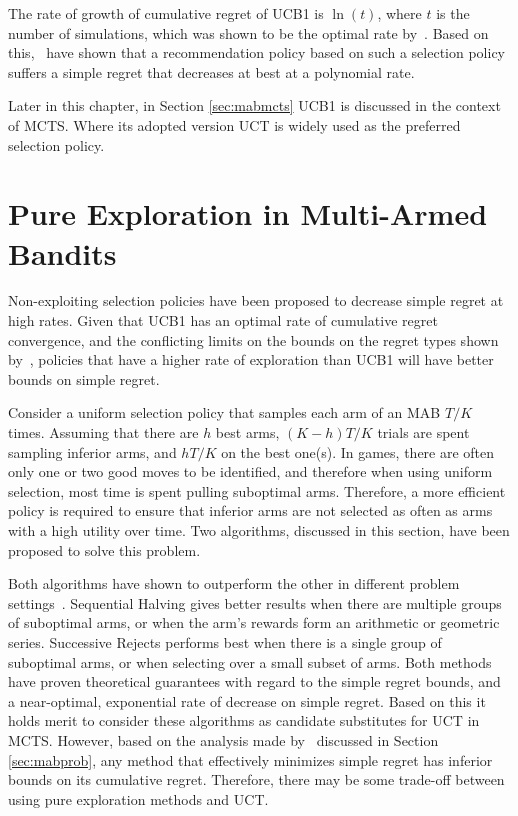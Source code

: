 \documentclass{kecsmstr}
\begin{document}
The rate of growth of cumulative regret of UCB1 is $\ln(t)$, where $t$ is the number of simulations, which was shown to be the optimal rate by~. Based on this,~ have shown that a recommendation policy based on such a selection policy suffers a simple regret that decreases at best at a polynomial rate. 

Later in this chapter, in Section \ref{sec:mabmcts} UCB1 is discussed in the context of MCTS. Where its adopted version UCT is widely used as the preferred selection policy.
\newpage
\section{Pure Exploration in Multi-Armed Bandits}
\label{sec:pureexplmab}
Non-exploiting selection policies have been proposed to decrease simple regret at high rates. Given that UCB1 has an optimal rate of cumulative regret convergence, and the conflicting limits on the bounds on the regret types shown by~, policies that have a higher rate of exploration than UCB1 will have better bounds on simple regret. 

Consider a uniform selection policy that samples each arm of an MAB $T/K$ times. Assuming that there are $h$ best arms, $(K-h)T/K$ trials are spent sampling inferior arms, and $hT/K$ on the best one(s). In games, there are often only one or two good moves to be identified, and therefore when using uniform selection, most time is spent pulling suboptimal arms. Therefore, a more efficient policy is required to ensure that inferior arms are not selected as often as arms with a high utility over time. Two algorithms, discussed in this section, have been proposed to solve this problem.

Both algorithms have shown to outperform the other in different problem settings~. Sequential Halving gives better results when there are multiple groups of suboptimal arms, or when the arm's rewards form an arithmetic or geometric series. Successive Rejects performs best when there is a single group of suboptimal arms, or when selecting over a small subset of arms. Both methods have proven theoretical guarantees with regard to the simple regret bounds, and a near-optimal, exponential rate of decrease on simple regret. Based on this it holds merit to consider these algorithms as candidate substitutes for UCT in MCTS. However, based on the analysis made by~ discussed in Section \ref{sec:mabprob}, any method that effectively minimizes simple regret has inferior bounds on its cumulative regret. Therefore, there may be some trade-off between using pure exploration methods and UCT.
\newpage
\end{document}
